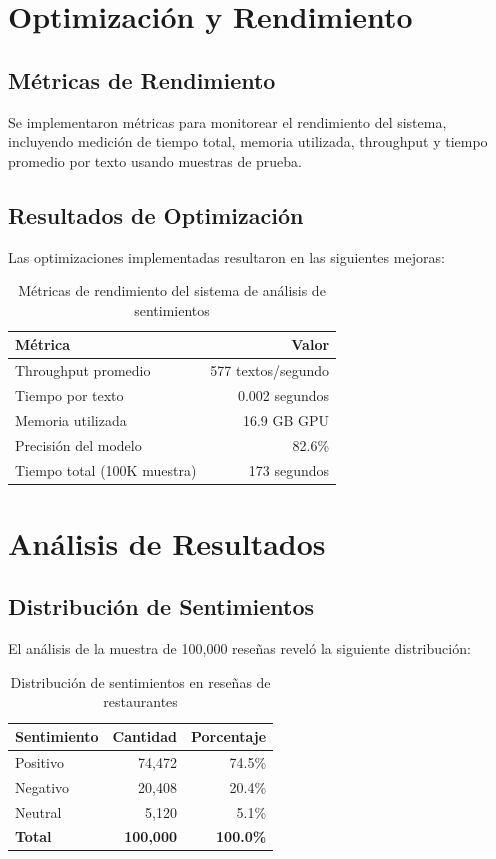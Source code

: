 \documentclass[12pt,a4paper,twoside,openany]{book}
\begin{document}
\section{Optimización y Rendimiento}

\subsection{Métricas de Rendimiento}

Se implementaron métricas para monitorear el rendimiento del sistema, incluyendo medición de tiempo total, memoria utilizada, throughput y tiempo promedio por texto usando muestras de prueba.

\subsection{Resultados de Optimización}

Las optimizaciones implementadas resultaron en las siguientes mejoras:

\begin{table}[H]
\centering
\caption{Métricas de rendimiento del sistema de análisis de sentimientos}
\begin{tabular}{@{}lr@{}}
\toprule
\textbf{Métrica} & \textbf{Valor} \\
\midrule
Throughput promedio & 577 textos/segundo \\
Tiempo por texto & 0.002 segundos \\
Memoria utilizada & 16.9 GB GPU \\
Precisión del modelo & 82.6\% \\
Tiempo total (100K muestra) & 173 segundos \\
\bottomrule
\end{tabular}
\end{table}

\section{Análisis de Resultados}

\subsection{Distribución de Sentimientos}

El análisis de la muestra de 100,000 reseñas reveló la siguiente distribución:

\begin{table}[H]
\centering
\caption{Distribución de sentimientos en reseñas de restaurantes}
\begin{tabular}{@{}lrr@{}}
\toprule
\textbf{Sentimiento} & \textbf{Cantidad} & \textbf{Porcentaje} \\
\midrule
Positivo & 74,472 & 74.5\% \\
Negativo & 20,408 & 20.4\% \\
Neutral & 5,120 & 5.1\% \\
\textbf{Total} & \textbf{100,000} & \textbf{100.0\%} \\
\bottomrule
\end{tabular}
\end{table}
\end{document}
